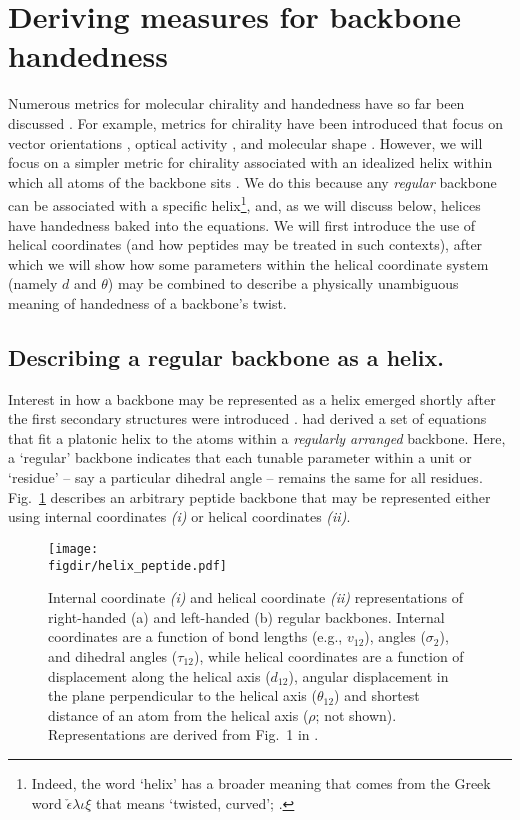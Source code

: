\documentclass[fleqn,10pt]{wlpeerj} %
\newcommand{\Fig}[1]{Fig.~\ref{#1}}
\newcommand{\figdir}{./figures}
\begin{document}
\section*{Deriving measures for backbone handedness}
Numerous metrics for molecular chirality and handedness have so far been discussed \citep{Harris1999}. For example, metrics for chirality have been introduced that focus on vector orientations \citep{Kwiecinska2005,Gruziel2013}, optical activity \citep{Osipov1995}, and molecular shape \citep{Ferrarini1998}. However, we will focus on a simpler metric for chirality associated with an idealized helix within which all atoms of the backbone sits \citep{Shimanouchi1955,Miyazawa1961,Zacharias2013}. We do this because any {\em regular} backbone can be associated with a specific helix\footnote{Indeed, the word `helix' has a broader meaning that comes from the Greek word $\check\epsilon\lambda\iota\xi$ that means `twisted, curved'; \cite{Liddell1894}.}, and, as we will discuss below, helices have handedness baked into the equations. We will first introduce the use of helical coordinates (and how peptides may be treated in such contexts), after which we will show how some parameters within the helical coordinate system (namely $d$ and $\theta$) may be combined to describe a physically unambiguous meaning of handedness of a backbone's twist.

\subsection*{Describing a regular backbone as a helix.} Interest in how a backbone may be represented as a helix emerged shortly after the first secondary structures were introduced \citep{Pauling1951,Pauling1951a,Pauling1951b}. \cite{Shimanouchi1955} had derived a set of equations that fit a platonic helix to the atoms within a {\it regularly arranged} backbone. Here, a `regular' backbone  indicates that each tunable parameter within a unit or `residue' -- say a particular dihedral angle -- remains the same for all residues. \Fig{fig:helix} describes an arbitrary peptide backbone that may be represented either using internal coordinates \textit{(i)} or helical coordinates \textit{(ii)}. 

\begin{figure}[t!]
\mbox{}\hfill
\texttt{[image: \\figdir/helix\_peptide.pdf]}
\hfill\mbox{}\hfill\mbox{}\newline
  \caption{Internal coordinate \textit{(i)} and helical coordinate \textit{(ii)} representations of right-handed (a) and left-handed (b) regular backbones. Internal coordinates are a function of bond lengths (e.g., $v_{12}$), angles ($\sigma_{2}$), and dihedral angles ($\tau_{12}$), while helical coordinates are a function of displacement along the helical axis ($d_{12}$), angular displacement in the plane perpendicular to the helical axis ($\theta_{12}$) and shortest distance of an  atom from the helical axis ($\rho$; not shown). Representations are derived from Fig.~1 in \citep{Shimanouchi1955}.
\label{fig:helix}}
\end{figure}
\end{document}
